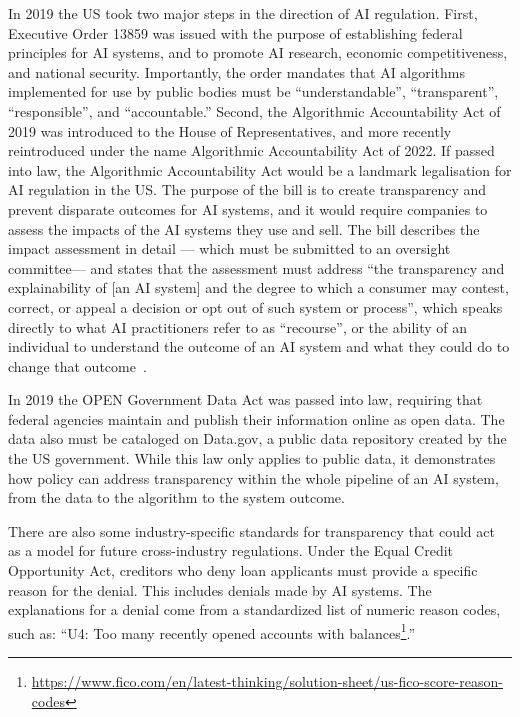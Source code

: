 \documentclass[sigconf, nonacm]{acmart}
\begin{document}
In 2019 the US took two major steps in the direction of AI regulation. First, Executive Order 13859 was issued with the purpose of establishing federal principles for AI systems, and to promote AI research, economic competitiveness, and national security. Importantly, the order mandates that AI algorithms implemented for use by public bodies must be ``understandable'', ``transparent'', ``responsible'', and ``accountable.'' Second, the Algorithmic Accountability Act of 2019 was introduced to the House of Representatives, and more recently reintroduced under the name Algorithmic Accountability Act of 2022. If passed into law, the Algorithmic Accountability Act would be a landmark legalisation for AI regulation in the US. The purpose of the bill is to create transparency and prevent disparate outcomes for AI systems, and it would require companies to assess the impacts of the AI systems they use and sell. The bill describes the impact assessment in detail --- which must be submitted to an oversight committee--- and states that the assessment must address ``the transparency and explainability of [an AI system] and the degree to which a consumer may contest, correct, or appeal a decision or opt out of such system or process'', 
which speaks directly to what AI practitioners refer to as ``recourse'', or the ability of an individual to understand the outcome of an AI system and what they could do to change that outcome~\cite{wachter2017counterfactual, ustun2019actionable}.

In 2019 the OPEN Government Data Act was passed into law, requiring that federal agencies maintain and publish their information online as open data. The data also must be cataloged on Data.gov, a public data repository created by the the US government. While this law only applies to public data, it demonstrates how policy can address transparency within the whole pipeline of an AI system, from the data to the algorithm to the system outcome.

There are also some industry-specific standards for transparency that could act as a model for future cross-industry regulations. Under the Equal Credit Opportunity Act, creditors who deny loan applicants must provide a specific reason for the denial. This includes denials made by AI systems. The explanations for a denial come from a standardized list of numeric reason codes, such as: ``U4: Too many recently opened accounts with balances\footnote{\url{https://www.fico.com/en/latest-thinking/solution-sheet/us-fico-score-reason-codes}}.''
\end{document}
